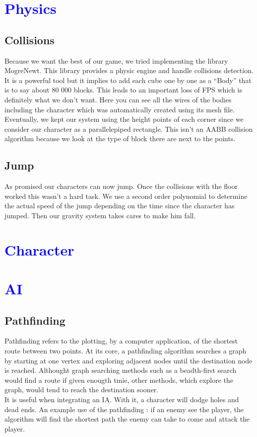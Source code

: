 \documentclass[article]{report}             %
\begin{document}
		\chapter{\textcolor{blue}{Physics}}
			\section{Collisions}
				Because we want the best of our game, we tried implementing the library MogreNewt. This library provides a physic engine and handle collisions detection. It is a powerful tool but it implies to add each cube one by one as a \enquote{Body} that is to say about 80 000 blocks. This leads to an important loss of FPS which is definitely what we don't want. Here you can see all the wires of the bodies including the character which was automatically created using its mesh file.\\

Eventually, we kept our system using the height points of each corner since we consider our character as a parallelepiped rectangle. This isn't an AABB collision algorithm because we look at the type of block there are next to the points.

			\section{Jump}
				As promised our characters can now jump. Once the collisions with the floor worked this wasn't a hard task. We use a second order polynomial to determine the actual speed of the jump depending on the time since the character has jumped. Then our gravity system takes cares to make him fall.
				
		\chapter{\textcolor{blue}{Character}}

		\chapter{\textcolor{blue}{AI}}
			\section{Pathfinding}
				Pathfinding refers to the plotting, by a computer application, of the shortest route between two points. At its core, a pathfinding algorithm searches a graph by starting at one vertex and exploring adjacent nodes until the destination node is reached. Althought graph searching methods such as a beadth-first search would find a route if given enougth tmie, other methods, which explore the graph, would tend to reach the destination sooner. \\
 It is useful when integrating an IA. With it, a character will dodge holes and dead ends. An example use of the pathfinding : if an enemy see the player, the algorithm will find the shortest path the enemy can take to come and attack the player.
\end{document}
